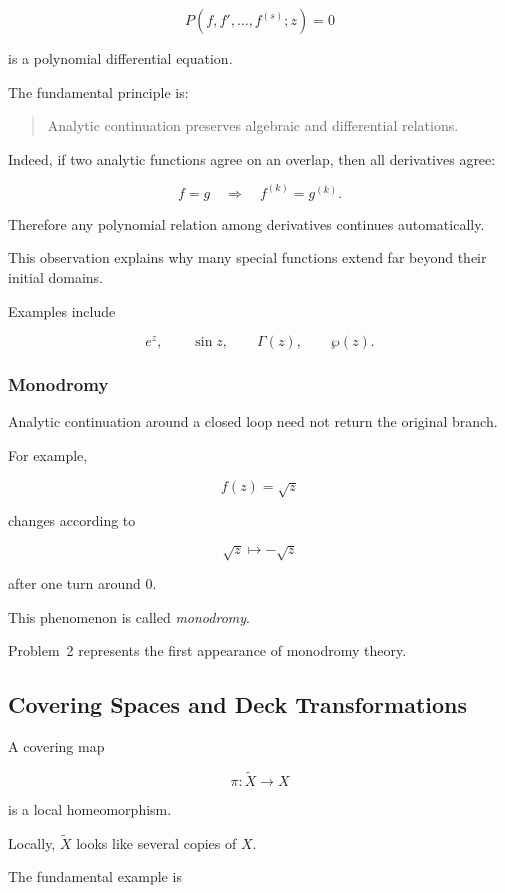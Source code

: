 \documentclass[12pt,a4paper]{article}
\theoremstyle{notespace}
\begin{document}
\[
P(f,f',\ldots,f^{(s)};z)=0
\]

is a polynomial differential equation.

The fundamental principle is:

\begin{quote}
	Analytic continuation preserves algebraic and differential relations.
\end{quote}

Indeed, if two analytic functions agree on an overlap, then all derivatives agree:

\[
f=g
\quad\Longrightarrow\quad
f^{(k)}=g^{(k)}.
\]

Therefore any polynomial relation among derivatives continues automatically.

This observation explains why many special functions extend far beyond their initial domains.

Examples include

\[
e^z,
\qquad
\sin z,
\qquad
\Gamma(z),
\qquad
\wp(z).
\]

\subsubsection*{Monodromy}

Analytic continuation around a closed loop need not return the original branch.

For example,

\[
f(z)=\sqrt z
\]

changes according to

\[
\sqrt z
\longmapsto
-\sqrt z
\]

after one turn around \(0\).

This phenomenon is called \emph{monodromy}.

Problem~2 represents the first appearance of monodromy theory.

\bigskip

\subsection{ Covering Spaces and Deck Transformations}

A covering map

\[
\pi:\widetilde X\to X
\]

is a local homeomorphism.

Locally, \(\widetilde X\) looks like several copies of \(X\).

The fundamental example is
\end{document}
